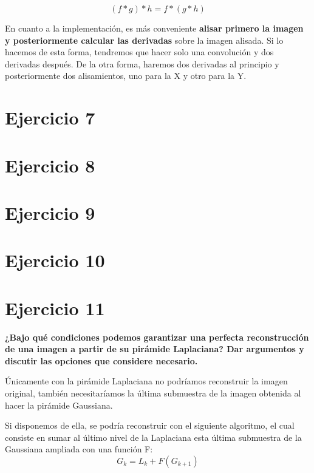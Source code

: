 \documentclass[11pt,a4paper]{article}
\begin{document}
\begin{equation}
(f*g)*h=f*(g*h)
\end{equation}

En cuanto a la implementación, es más conveniente \textbf{alisar primero la imagen y posteriormente calcular las derivadas} sobre
la imagen alisada. Si lo hacemos de esta forma, tendremos que hacer solo una convolución y dos derivadas después. De la otra forma,
haremos dos derivadas al principio y posteriormente dos alisamientos, uno para la X y otro para la Y.


\section*{Ejercicio 7}

\textbf{}


\section*{Ejercicio 8}


\section*{Ejercicio 9}


\section*{Ejercicio 10}


\section*{Ejercicio 11}

\textbf{¿Bajo qué condiciones podemos garantizar una perfecta reconstrucción de una imagen a partir de su pirámide Laplaciana? Dar
argumentos y discutir las opciones que considere necesario.}

Únicamente con la pirámide Laplaciana no podríamos reconstruir la imagen original, también necesitaríamos la última submuestra de
la imagen obtenida al hacer la pirámide Gaussiana.

Si disponemos de ella, se podría reconstruir con el siguiente algoritmo, el cual consiste en sumar al último nivel de la Laplaciana
esta última submuestra de la Gaussiana ampliada con una función F:
\begin{equation}
G_k=L_k+F(G_{k+1})
\end{equation}
\end{document}
